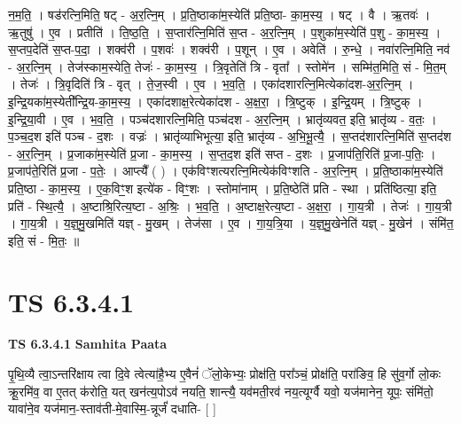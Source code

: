 \documentclass[17pt]{extarticle}
\begin{document}
न॒म॒ति॒ । षड॑रत्नि॒मिति॒ षट् - अ॒र॒त्नि॒म् । प्र॒ति॒ष्ठाका॑म॒स्येति॑ प्रति॒ष्ठा- का॒म॒स्य॒ । षट् । वै । ऋ॒तवः॑ । ऋ॒तुषु॑ । ए॒व । प्रतीति॑ । ति॒ष्ठ॒ति॒ । स॒प्तार॑त्नि॒मिति॑ स॒प्त - अ॒र॒त्नि॒म् । प॒शुका॑म॒स्येति॑ प॒शु - का॒म॒स्य॒ । स॒प्तप॒देति॑ स॒प्त-प॒दा॒ । शक्व॑री । प॒शवः॑ । शक्व॑री । प॒शून् । ए॒व । अवेति॑ । रु॒न्धे॒ । नवा॑रत्नि॒मिति॒ नव॑ - अ॒र॒त्नि॒म् । तेज॑स्काम॒स्येति॒ तेजः॑ - का॒म॒स्य॒ । त्रि॒वृतेति॑ त्रि - वृता᳚ । स्तोमे॑न । सम्मि॑त॒मिति॒ सं - मि॒त॒म् । तेजः॑ । त्रि॒वृदिति॑ त्रि - वृत् । ते॒ज॒स्वी । ए॒व । भ॒व॒ति॒ । एका॑दशारत्नि॒मित्येका॑दश-अ॒र॒त्नि॒म् । इ॒न्द्रि॒यका॑म॒स्येती᳚न्द्रि॒य-का॒म॒स्य॒ । एका॑दशाक्ष॒रेत्येका॑दश - अ॒क्ष॒रा॒ । त्रि॒ष्टुक् । इ॒न्द्रि॒यम् । त्रि॒ष्टुक् । इ॒न्द्रि॒या॒वी । ए॒व । भ॒व॒ति॒ । पञ्च॑दशारत्नि॒मिति॒ पञ्च॑दश - अ॒र॒त्नि॒म् । भ्रातृ॑व्यवत॒ इति॒ भ्रातृ॑व्य - व॒तः॒ । प॒ञ्च॒द॒श इति॑ पञ्च - द॒शः । वज्रः॑ । भ्रातृ॑व्याभिभूत्या॒ इति॒ भ्रातृ॑व्य - अ॒भि॒भू॒त्यै॒ । स॒प्तद॑शारत्नि॒मिति॑ स॒प्तद॑श - अ॒र॒त्नि॒म् । प्र॒जाका॑म॒स्येति॑ प्र॒जा - का॒म॒स्य॒ । स॒प्त॒द॒श इति॑ सप्त - द॒शः । प्र॒जाप॑ति॒रिति॑ प्र॒जा-प॒तिः॒ । प्र॒जाप॑ते॒रिति॑ प्र॒जा - प॒तेः॒ । आप्त्यै᳚ ( ) । एक॑विꣳशत्यरत्नि॒मित्येक॑विꣳशति - अ॒र॒त्नि॒म् । प्र॒ति॒ष्ठाका॑म॒स्येति॑ प्रति॒ष्ठा - का॒म॒स्य॒ । ए॒क॒विꣳ॒॒श इत्ये॑क - विꣳ॒॒शः । स्तोमा॑नाम् । प्र॒ति॒ष्ठेति॑ प्रति - स्था । प्रति॑ष्ठित्या॒ इति॒ प्रति॑ - स्थि॒त्यै॒ । अ॒ष्टाश्रि॒रित्य॒ष्टा - अ॒श्रिः॒ । भ॒व॒ति॒ । अ॒ष्टाक्ष॒रेत्य॒ष्टा - अ॒क्ष॒रा॒ । गा॒य॒त्री । तेजः॑ । गा॒य॒त्री । गा॒य॒त्री । य॒ज्ञ्॒मु॒खमिति॑ यज्ञ् - मु॒खम् । तेज॑सा । ए॒व । गा॒य॒त्रि॒या । य॒ज्ञ्॒मु॒खेनेति॑ यज्ञ् - मु॒खेन॑ । संमि॑त॒ इति॒ सं - मि॒तः॒ ॥  \newline




\section*{ TS 6.3.4.1 }

\textbf{TS 6.3.4.1 } \newline
\textbf{Samhita Paata} \newline

पृ॒थि॒व्यै त्वा॒ऽन्तरि॑क्षाय त्वा दि॒वे त्वेत्या॑है॒भ्य ए॒वैनं॑ ॅलो॒केभ्यः॒ प्रोक्ष॑ति॒ परा᳚ञ्चं॒ प्रोक्ष॑ति॒ परा॑ङिव॒ हि सु॑व॒र्गो लो॒कः क्रू॒रमि॑व॒ वा ए॒तत् क॑रोति॒ यत् खन॑त्य॒पोऽव॑ नयति॒ शान्त्यै॒ यव॑मती॒रव॑ नय॒त्यूर्ग्वै यवो॒ यज॑मानेन॒ यूपः॒ संमि॑तो॒ यावा॑ने॒व यज॑मान॒-स्ताव॑ती-मे॒वास्मि॒-न्नूर्जं॑ दधाति- [  ] \newline
\end{document}
